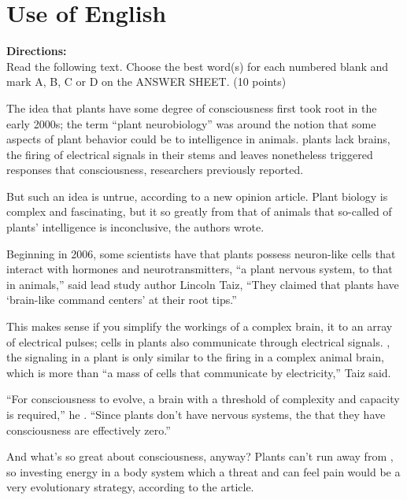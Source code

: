 

\section{Use of English}

\noindent
\textbf{Directions:}\\
Read the following text. Choose the best word(s) for each numbered blank
and mark A, B, C or D on the
ANSWER SHEET. (10 points)

\TiGanSpace


The idea that plants have some degree of consciousness first took root
in the early 2000s; the term ``plant
neurobiology'' was  \cloze around the notion that some aspects of plant behavior could be
\cloze 
to intelligence in
animals.
 \cloze 
plants lack brains, the firing of electrical signals in their stems and
leaves nonetheless triggered
responses that  \cloze 
consciousness, researchers previously reported.


But such an idea is untrue, according to a new opinion article. Plant
biology is complex and fascinating, but it
 \cloze 
so greatly from that of animals that so-called
 \cloze 
 of plants' intelligence is inconclusive, the authors wrote.
 
 
Beginning in 2006, some scientists have
 \cloze 
 that plants possess neuron-like cells that interact with
hormones and neurotransmitters,
 \cloze 
``a plant nervous system,  \cloze 
to that in animals,'' said lead study author 
Lincoln Taiz, ``They  \cloze claimed that plants have `brain-like command centers' at their root
tips.''



This
 \cloze 
makes sense if you simplify the workings of a complex brain,
 \cloze 
it to an array of electrical pulses; cells in plants also communicate through electrical signals.
 \cloze , the signaling in a plant is only
 \cloze 
similar to the firing in a complex animal brain, which is more than ``a
mass of cells that communicate by
electricity,'' Taiz said.



``For consciousness to evolve, a brain with a threshold
 \cloze 
of complexity and capacity is required,'' he 
  \cloze . ``Since plants don't have nervous systems, the
 \cloze 
that they have consciousness are effectively zero.''


And what's so great about consciousness, anyway? Plants can't run away
from
 \cloze , so investing energy in
a body system which
 \cloze 
a threat and can feel pain would be a very
 \cloze 
evolutionary strategy, according to
the article.

